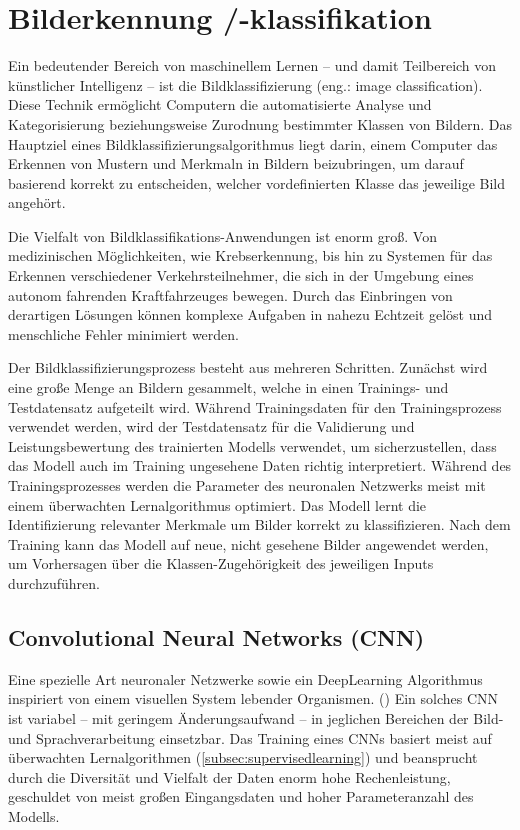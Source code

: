 \section{Bilderkennung /-klassifikation} \label{chpt:Stand_der_Technik_Bilderkennung}
Ein bedeutender Bereich von maschinellem Lernen -- und damit Teilbereich von künstlicher Intelligenz -- ist die Bildklassifizierung (eng.: image classification). Diese Technik ermöglicht Computern die automatisierte Analyse und Kategorisierung beziehungsweise Zurodnung bestimmter Klassen von Bildern. Das Hauptziel eines Bildklassifizierungsalgorithmus liegt darin, einem Computer das Erkennen von Mustern und Merkmaln in Bildern beizubringen, um darauf basierend korrekt zu entscheiden, welcher vordefinierten Klasse das jeweilige Bild angehört.

Die Vielfalt von Bildklassifikations-Anwendungen ist enorm groß. Von medizinischen Möglichkeiten, wie Krebserkennung, bis hin zu Systemen für das Erkennen verschiedener Verkehrsteilnehmer, die sich in der Umgebung eines autonom fahrenden Kraftfahrzeuges bewegen. Durch das Einbringen von derartigen Lösungen können komplexe Aufgaben in nahezu Echtzeit gelöst und menschliche Fehler minimiert werden.

Der Bildklassifizierungsprozess besteht aus mehreren Schritten. Zunächst wird eine große Menge an Bildern gesammelt, welche in einen Trainings- und Testdatensatz aufgeteilt wird. Während Trainingsdaten für den Trainingsprozess verwendet werden, wird der Testdatensatz für die Validierung und Leistungsbewertung des trainierten Modells verwendet, um sicherzustellen, dass das Modell auch im Training ungesehene Daten richtig interpretiert. Während des Trainingsprozesses werden die Parameter des neuronalen Netzwerks meist mit einem überwachten Lernalgorithmus optimiert. Das Modell lernt die Identifizierung relevanter Merkmale um Bilder korrekt zu klassifizieren. Nach dem Training kann das Modell auf neue, nicht gesehene Bilder angewendet werden, um Vorhersagen über die Klassen-Zugehörigkeit des jeweiligen Inputs durchzuführen.

\subsection{Convolutional Neural Networks (CNN)}
Eine spezielle Art neuronaler Netzwerke sowie ein DeepLearning Algorithmus inspiriert von einem visuellen System lebender Organismen. (\cite[519]{balas_recent_2020}) Ein solches CNN ist variabel -- mit geringem Änderungsaufwand -- in jeglichen Bereichen der Bild- und Sprachverarbeitung einsetzbar. Das Training eines CNNs basiert meist auf überwachten Lernalgorithmen  (\ref{subsec:supervisedlearning}) und beansprucht durch die Diversität und Vielfalt der Daten enorm hohe Rechenleistung, geschuldet von meist großen Eingangsdaten und hoher Parameteranzahl des Modells.

